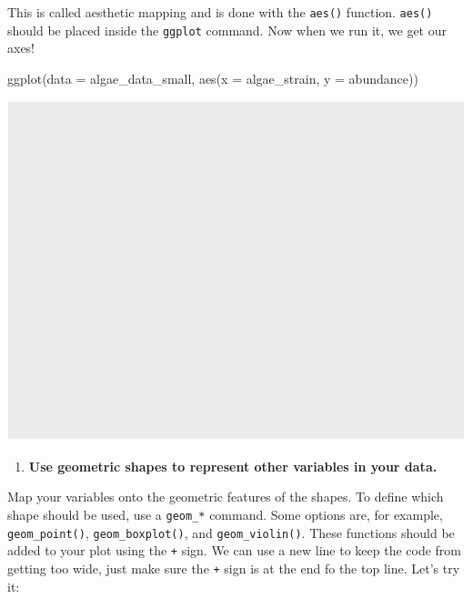 \documentclass[
]{krantz}
\newenvironment{Shaded}{\begin{snugshade}}{\end{snugshade}}
\newcommand{\AttributeTok}[1]{\textcolor[rgb]{0.77,0.63,0.00}{#1}}
\newcommand{\FunctionTok}[1]{\textcolor[rgb]{0.00,0.00,0.00}{#1}}
\newcommand{\NormalTok}[1]{#1}
\providecommand{\tightlist}{%
  \setlength{\itemsep}{0pt}\setlength{\parskip}{0pt}}
\begin{document}
This is called aesthetic mapping and is done with the \texttt{aes()} function. \texttt{aes()} should be placed inside the \texttt{ggplot} command. Now when we run it, we get our axes!

\begin{Shaded}
\begin{Highlighting}[]
\FunctionTok{ggplot}\NormalTok{(}\AttributeTok{data =}\NormalTok{ algae\_data\_small, }\FunctionTok{aes}\NormalTok{(}\AttributeTok{x =}\NormalTok{ algae\_strain, }\AttributeTok{y =}\NormalTok{ abundance))}
\end{Highlighting}
\end{Shaded}

\begin{center}\includegraphics{index_files/figure-latex/unnamed-chunk-21-1} \end{center}

\begin{enumerate}
\def\labelenumi{\arabic{enumi}.}
\setcounter{enumi}{2}
\tightlist
\item
  \textbf{Use geometric shapes to represent other variables in your data.}
\end{enumerate}

Map your variables onto the geometric features of the shapes. To define which shape should be used, use a \texttt{geom\_*} command. Some options are, for example, \texttt{geom\_point()}, \texttt{geom\_boxplot()}, and \texttt{geom\_violin()}. These functions should be added to your plot using the \texttt{+} sign. We can use a new line to keep the code from getting too wide, just make sure the \texttt{+} sign is at the end fo the top line. Let's try it:
\end{document}

